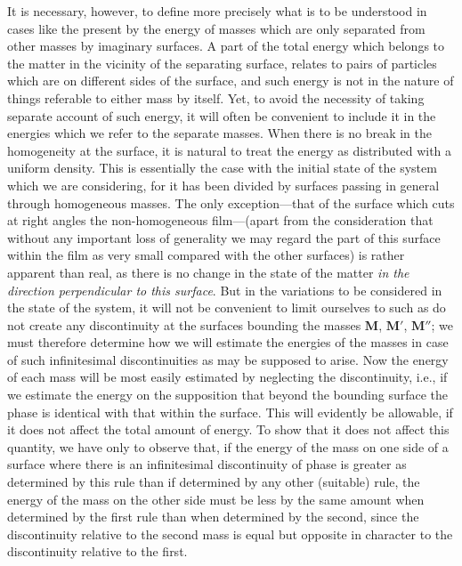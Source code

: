 \documentclass[12pt]{memoir}
\begin{document}
{It is necessary, however, to define more precisely what is to be understood in cases like the present by the energy of masses which are only separated from other masses by imaginary surfaces. A part of the total energy which belongs to the matter in the vicinity of the separating surface, relates to pairs of particles which are on different sides of the surface, and such energy is not in the nature of things referable to either mass by itself. Yet, to avoid the necessity of taking separate account of such energy, it will often be convenient to include it in the energies which we refer to the separate masses. When there is no break in the homogeneity at the surface, it is natural to treat the energy as distributed with a uniform density. This is essentially the case with the initial state of the system which we are considering, for it has been divided by surfaces passing in general through homogeneous masses. The only exception---that of the surface which cuts at right angles the non-homogeneous film---(apart from the consideration that without any important loss of generality we may regard the part of this surface within the film as very small compared with the other surfaces) is rather apparent than real, as there is no change in the state of the matter \textit{in the direction perpendicular to this surface}. But in the variations to be considered in the state of the system, it will not be convenient to limit ourselves to such as do not create any discontinuity at the surfaces bounding the masses $\mathbf{M}$, $\mathbf{M}'$, $\mathbf{M}''$; we must therefore determine how we will estimate the energies of the masses in case of such infinitesimal discontinuities as may be supposed to arise. Now the energy of each mass will be most easily estimated by neglecting the discontinuity, i.e., if we estimate the energy on the supposition that beyond the bounding surface the phase is identical with that within the surface. This will evidently be allowable, if it does not affect the total amount of energy. To show that it does not affect this quantity, we have only to observe that, if the energy of the mass on one side of a surface where there is an infinitesimal discontinuity of phase is greater as determined by this rule than if determined by any other (suitable) rule, the energy of the mass on the other side must be less by the same amount when determined by the first rule than when determined by the second, since the discontinuity relative to the second mass is equal but opposite in character to the discontinuity relative to the first.

}
\end{document}
